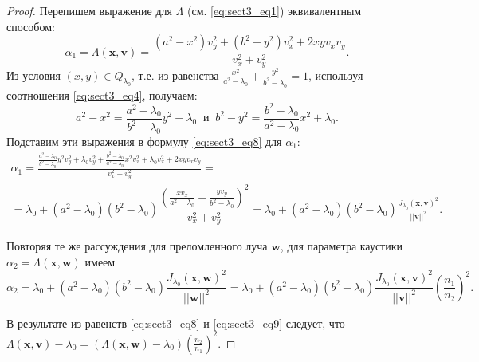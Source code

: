 \begin{proof}
Перепишем выражение для $\Lambda$ (см. \eqref{eq:sect3_eq1}) эквивалентным способом:
\begin{equation}
\alpha_1 = \Lambda(\mathbf{x}, \mathbf{v}) = \frac{(a^2-x^2) v_y^2 + (b^2-y^2)v_x^2 +2 x y v_x v_y}{v_x^2 + v_y^2}.
\label{eq:sect3_eq8}
\end{equation}
Из условия $(x,y) \in Q_{\lambda_0}$, т.е. из равенства $\frac{x^2}{a^2-\lambda_0} + \frac{y^2}{b^2-\lambda_0} =1$, используя соотношения \eqref{eq:sect3_eq4}, получаем:
$$a^2-x^2=\frac{a^2-\lambda_0}{b^2-\lambda_0}y^2+\lambda_0 \ \text{ и }\  b^2-y^2 = \frac{b^2-\lambda_0}{a^2-\lambda_0}x^2+\lambda_0.$$
Подставим эти выражения в формулу \eqref{eq:sect3_eq8} для $\alpha_1$:
\begin{multline*}
\alpha_1 = \frac{\frac{a^2-\lambda_0}{b^2-\lambda_0}y^2v_y^2 + \lambda_0 v_y^2 + \frac{b^2-\lambda_0}{a^2-\lambda_0}x^2v_x^2 + \lambda_0 v_x^2 + 2x y v_x v_y}{v_x^2+v_y^2} = \\
=\lambda_0 + (a^2-\lambda_0)(b^2-\lambda_0)\dfrac{(\frac{x v_x}{a^2-\lambda_0} + \frac{y v_y}{b^2-\lambda_0})^2}{v_x^2 + v_y^2} = 
\lambda_0 + (a^2-\lambda_0)(b^2-\lambda_0)\frac{J_{\lambda_0}(\mathbf{x}, \mathbf{v})^2}{||\mathbf{v}||^2}.
\end{multline*}

Повторяя те же рассуждения для преломленного луча $\mathbf{w}$, для параметра каустики $\alpha_2 = \Lambda(\mathbf{x}, \mathbf{w})$ имеем 
\begin{equation}
\alpha_2 = \lambda_0 + (a^2-\lambda_0)(b^2-\lambda_0)\frac{J_{\lambda_0}(\mathbf{x}, \mathbf{w})^2}{||\mathbf{w}||^2} = \lambda_0 + (a^2-\lambda_0)(b^2-\lambda_0)\frac{J_{\lambda_0}(\mathbf{x}, \mathbf{v})^2}{||\mathbf{v}||^2} \left(\frac{n_1}{n_2}\right)^2.
\label{eq:sect3_eq9}
\end{equation}

В результате из равенств \eqref{eq:sect3_eq8} и \eqref{eq:sect3_eq9} следует, что $\Lambda(\mathbf{x}, \mathbf{v}) - \lambda_0 = (\Lambda(\mathbf{x}, \mathbf{w}) - \lambda_0)\left(\frac{n_2}{n_1}\right)^2$. 
\end{proof}


